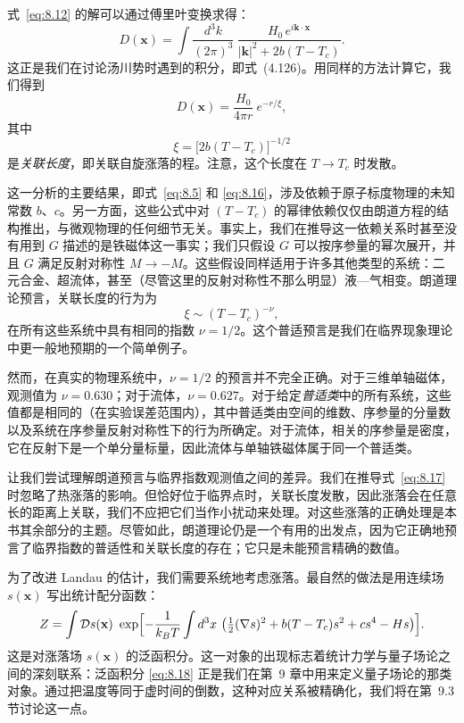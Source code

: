 式~\eqref{eq:8.12} 的解可以通过傅里叶变换求得：
\begin{equation}
  D(\mathbf{x}) = \int \frac{d^3k}{(2\pi)^3}\
    \frac{H_0\,e^{i\mathbf{k}\cdot\mathbf{x}}}{|\mathbf{k}|^2
      + 2b(T-T_c)} .
  \label{eq:8.14}
\end{equation}
这正是我们在讨论汤川势时遇到的积分，即式~(4.126)。用同样的方法计算它，我们得到
\begin{equation}
  D(\mathbf{x}) = \frac{H_0}{4\pi r}\ e^{-r/\xi},
  \label{eq:8.15}
\end{equation}
其中
\begin{equation}
  \xi = \bigl[ 2b(T-T_c) \bigr]^{-1/2}
  \label{eq:8.16}
\end{equation}
是\emph{关联长度}，即关联自旋涨落的程。注意，这个长度在 $T\to T_c$ 时发散。

这一分析的主要结果，即式~\eqref{eq:8.5} 和 \eqref{eq:8.16}，涉及依赖于原子标度物理的未知常数 $b$、$c$。另一方面，这些公式中对 $(T-T_c)$ 的幂律依赖仅仅由朗道方程的结构推出，与微观物理的任何细节无关。事实上，我们在推导这一依赖关系时甚至没有用到 $G$ 描述的是铁磁体这一事实；我们只假设 $G$ 可以按序参量的幂次展开，并且 $G$ 满足反射对称性 $M\to-M$。这些假设同样适用于许多其他类型的系统：二元合金、超流体，甚至（尽管这里的反射对称性不那么明显）液—气相变。朗道理论预言，关联长度的行为为
\begin{equation}
  \xi \sim (T-T_c)^{-\nu},
  \label{eq:8.17}
\end{equation}
在所有这些系统中具有相同的指数 $\nu = 1/2$。这个普适预言是我们在临界现象理论中更一般地预期的一个简单例子。

然而，在真实的物理系统中，$\nu = 1/2$ 的预言并不完全正确。对于三维单轴磁体，观测值为 $\nu = 0.630$；对于流体，$\nu = 0.627$。对于给定\emph{普适类}中的所有系统，这些值都是相同的（在实验误差范围内），其中普适类由空间的维数、序参量的分量数以及系统在序参量反射对称性下的行为所确定。对于流体，相关的序参量是密度，它在反射下是一个单分量标量，因此流体与单轴铁磁体属于同一个普适类。

让我们尝试理解朗道预言与临界指数观测值之间的差异。我们在推导式~\eqref{eq:8.17} 时忽略了热涨落的影响。但恰好位于临界点时，关联长度发散，因此涨落会在任意长的距离上关联，我们不应把它们当作小扰动来处理。对这些涨落的正确处理是本书其余部分的主题。尽管如此，朗道理论仍是一个有用的出发点，因为它正确地预言了临界指数的普适性和关联长度的存在；它只是未能预言精确的数值。

为了改进 Landau 的估计，我们需要系统地考虑涨落。最自然的做法是用连续场 $s(\mathbf{x})$ 写出统计配分函数：
\begin{equation}
  Z = \int \mathcal{D}s(\mathbf{x})\ \exp\Bigl[ -\frac{1}{k_BT}\int d^3x\
    \bigl( \tfrac{1}{2}(\nabla s)^2 + b(T-T_c)s^2 + cs^4 - Hs \bigr) \Bigr].
  \label{eq:8.18}
\end{equation}
这是对涨落场 $s(\mathbf{x})$ 的泛函积分。这一对象的出现标志着统计力学与量子场论之间的深刻联系：泛函积分 \eqref{eq:8.18} 正是我们在第~9 章中用来定义量子场论的那类对象。通过把温度等同于虚时间的倒数，这种对应关系被精确化，我们将在第~9.3 节讨论这一点。

